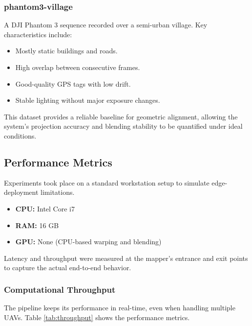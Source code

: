 \documentclass[conference]{IEEEtran}
\begin{document}
\subsubsection{phantom3-village}
A DJI Phantom 3 sequence recorded over a semi-urban village. Key characteristics include:
\begin{itemize}
    \item Mostly static buildings and roads.
    \item High overlap between consecutive frames.
    \item Good-quality GPS tags with low drift.
    \item Stable lighting without major exposure changes.
\end{itemize}
This dataset provides a reliable baseline for geometric alignment, allowing the system’s projection accuracy and blending stability to be quantified under ideal conditions.

\subsection{Performance Metrics}
Experiments took place on a standard workstation setup to simulate edge-deployment limitations.
\begin{itemize}
    \item \textbf{CPU:} Intel Core i7
    \item \textbf{RAM:} 16 GB
    \item \textbf{GPU:} None (CPU-based warping and blending)
\end{itemize}
Latency and throughput were measured at the mapper’s entrance and exit points to capture the actual end-to-end behavior.
\subsubsection{Computational Throughput}
The pipeline keeps its performance in real-time, even when handling multiple UAVs. Table \ref{tab:throughput} shows the performance metrics.
\end{document}
